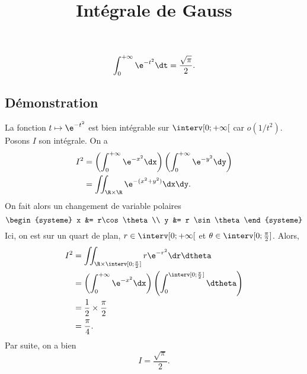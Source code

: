 \documentclass[fontsize=12pt,twoside=false,parskip=half, french]{scrartcl}
\title{Intégrale de Gauss}
\date{}
\author{}
\begin{document}
\maketitle
   \begin{Theoreme}
      \[
         \int_0^{+\infty} \e^{-t^2} \dt = \frac{\sqrt{\pi}}{2}.
      \]
   \end{Theoreme}
   \subsection{Démonstration}
      La fonction $t \mapsto \e^{-t^2}$ est bien intégrable sur $\interv[0; +\infty[$ car $o(1/t^2)$.
      Posons $I$ son intégrale. On a 
      \begin{align*}
         I^2 &= \left( \int_0^{+\infty} \e^{-x^2} \dx \right) \left( \int_0^{+\infty} \e^{-y^2} \dy \right) \\
             &= \iint_{\R \times \R} \e^{-(x^2 + y^2)} \dx \dy.
      \end{align*}
      On fait alors un changement de variable polaires
      \[
         \begin{systeme}
            x &= r\cos \theta\\
            y &= r \sin \theta
         \end{systeme}
      \]
      Ici, on est sur un quart de plan, $r \in \interv[0; +\infty[$ et $\theta \in \interv[0; \frac{\pi}{2}]$. Alors,
      \begin{align*}
         I^2 &= \iint_{\R \times \interv[0; \frac{\pi}{2}]} r \e^{-r^2} \dr \dtheta\\
             &= \left( \int_0^{+\infty} \e^{-x^2} \dx \right) \left( \int_0^{\interv[0; \frac{\pi}{2}]} \dtheta \right)\\
             &= \frac{1}{2} \times \frac{\pi}{2}\\
             &= \frac{\pi}{4}.
      \end{align*}
      Par suite, on a bien
      \[
         I = \frac{\sqrt{\pi}}{2}.
      \]
\end{document}
